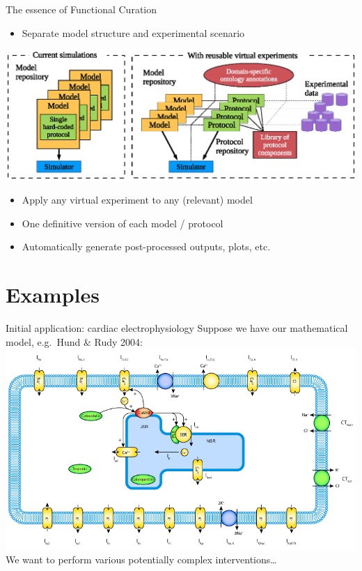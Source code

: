 \documentclass[t,xcolor={usenames,dvipsnames}]{beamer}
\newcommand{\subitem}[1]{\begin{itemize}[<.->]\item #1 \end{itemize}}
\begin{document}
\begin{frame}{The essence of Functional Curation}
\subitem{Separate \alert{model structure} and \alert{experimental scenario}}
\begin{center}
\includegraphics[width=.9\textwidth]{VirtEx_new}
\end{center}
\vspace{-.25cm}
\begin{itemize}
\item Apply any \alert{virtual experiment} to any (relevant) model
\item One definitive version of each model / protocol
\item Automatically generate post-processed outputs, plots, etc.
\end{itemize}
\end{frame}


\section{Examples}

\begin{frame}{Initial application: cardiac electrophysiology}
\small
Suppose we have our mathematical model, e.g.\ Hund \& Rudy 2004:\\
\includegraphics[width=\textwidth]{hund_2004}\\
We want to perform various potentially complex interventions\ldots
\end{frame}
\end{document}
